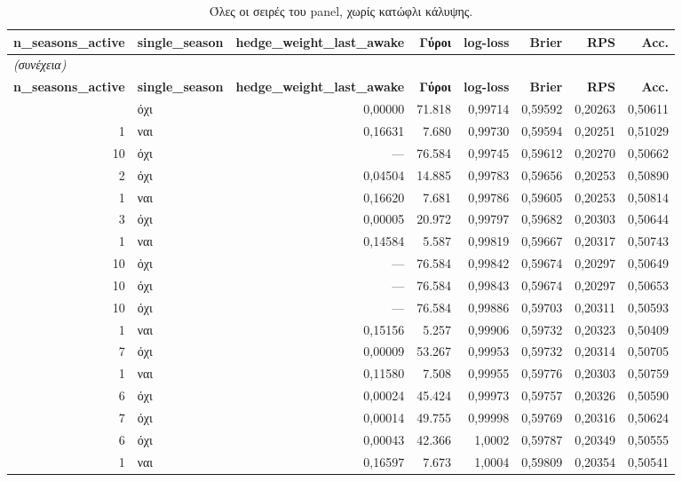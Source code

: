 {\scriptsize
\begin{longtable}{@{}rlrrrrrr@{}}
\caption{Όλες οι σειρές του panel, χωρίς κατώφλι κάλυψης.}\label{app:allseries}\\
\toprule \textbf{n\_seasons\_active} & \textbf{single\_season} & \textbf{hedge\_weight\_last\_awake} & \textbf{Γύροι} & \textbf{log-loss} & \textbf{Brier} & \textbf{RPS} & \textbf{Acc.} \\\midrule\endfirsthead
\multicolumn{8}{l}{\emph{(συνέχεια)}}\\\toprule \textbf{n\_seasons\_active} & \textbf{single\_season} & \textbf{hedge\_weight\_last\_awake} & \textbf{Γύροι} & \textbf{log-loss} & \textbf{Brier} & \textbf{RPS} & \textbf{Acc.} \\\midrule\endhead
\bottomrule\endfoot
10 & όχι & 0,00000 & 71.818 & 0,99714 & 0,59592 & 0,20263 & 0,50611 \\
1 & ναι & 0,16631 & 7.680 & 0,99730 & 0,59594 & 0,20251 & 0,51029 \\
10 & όχι & --- & 76.584 & 0,99745 & 0,59612 & 0,20270 & 0,50662 \\
2 & όχι & 0,04504 & 14.885 & 0,99783 & 0,59656 & 0,20253 & 0,50890 \\
1 & ναι & 0,16620 & 7.681 & 0,99786 & 0,59605 & 0,20253 & 0,50814 \\
3 & όχι & 0,00005 & 20.972 & 0,99797 & 0,59682 & 0,20303 & 0,50644 \\
1 & ναι & 0,14584 & 5.587 & 0,99819 & 0,59667 & 0,20317 & 0,50743 \\
10 & όχι & --- & 76.584 & 0,99842 & 0,59674 & 0,20297 & 0,50649 \\
10 & όχι & --- & 76.584 & 0,99843 & 0,59674 & 0,20297 & 0,50653 \\
10 & όχι & --- & 76.584 & 0,99886 & 0,59703 & 0,20311 & 0,50593 \\
1 & ναι & 0,15156 & 5.257 & 0,99906 & 0,59732 & 0,20323 & 0,50409 \\
7 & όχι & 0,00009 & 53.267 & 0,99953 & 0,59732 & 0,20314 & 0,50705 \\
1 & ναι & 0,11580 & 7.508 & 0,99955 & 0,59776 & 0,20303 & 0,50759 \\
6 & όχι & 0,00024 & 45.424 & 0,99973 & 0,59757 & 0,20326 & 0,50590 \\
7 & όχι & 0,00014 & 49.755 & 0,99998 & 0,59769 & 0,20316 & 0,50624 \\
6 & όχι & 0,00043 & 42.366 & 1,0002 & 0,59787 & 0,20349 & 0,50555 \\
1 & ναι & 0,16597 & 7.673 & 1,0004 & 0,59809 & 0,20354 & 0,50541 \\

\end{longtable}}
